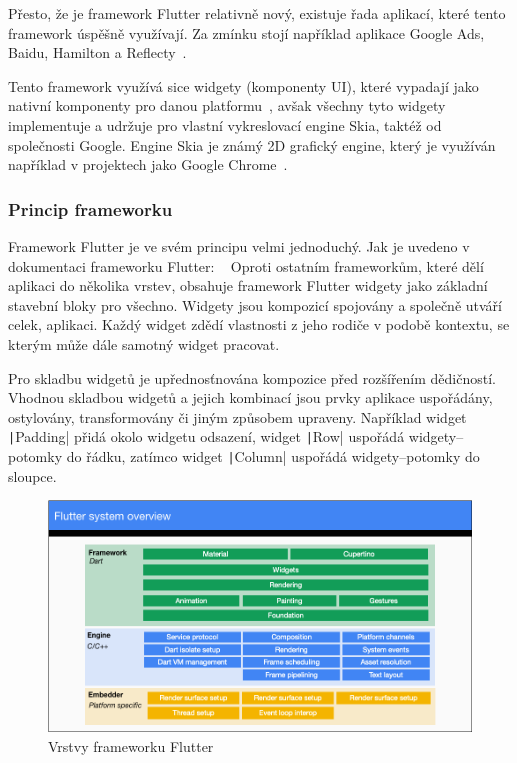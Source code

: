 Přesto,
že je framework Flutter relativně nový,
existuje řada aplikací,
které tento framework úspěšně využívají.
Za zmínku stojí například aplikace Google Ads, Baidu, Hamilton a
Reflecty~\cite{flutter}.

Tento framework využívá sice widgety (komponenty UI),
které vypadají jako nativní komponenty pro danou platformu~\cite{flutter},
avšak všechny tyto widgety implementuje a udržuje pro vlastní vykreslovací
engine Skia,
taktéž od společnosti Google.
Engine Skia je známý 2D grafický engine,
který je využíván například v projektech jako Google Chrome~\cite{skia}.

\subsubsection*{Princip frameworku }

Framework Flutter je ve svém principu velmi jednoduchý.
Jak je uvedeno v dokumentaci frameworku Flutter:
~\cite{flutter_technical_overview}
Oproti ostatním frameworkům,
které dělí aplikaci do několika vrstev,
obsahuje framework Flutter widgety jako základní stavební bloky pro všechno.
Widgety jsou kompozicí spojovány a společně utváří celek, aplikaci.
Každý widget zdědí vlastnosti z jeho rodiče v podobě kontextu,
se kterým může dále samotný widget pracovat.
\cite{flutter_technical_overview}

Pro skladbu widgetů je upřednosťnována kompozice před rozšířením dědičností.
Vhodnou skladbou widgetů a jejich kombinací jsou prvky aplikace uspořádány,
ostylovány, transformovány či jiným způsobem upraveny.
Například widget \texttt|Padding| přidá okolo widgetu odsazení,
widget \texttt|Row| uspořádá widgety--potomky do řádku,
zatímco widget \texttt|Column| uspořádá widgety--potomky do sloupce.
\cite{flutter_technical_overview}

\begin{figure}[ht!]
    \centering
    \includegraphics[width=\linewidth]{assets/technology-research/framework/flutter_overview.png}
    \caption{Vrstvy frameworku Flutter ~\cite{flutter_technical_overview}}
    \label{fig:flutter_layers}
\end{figure}


